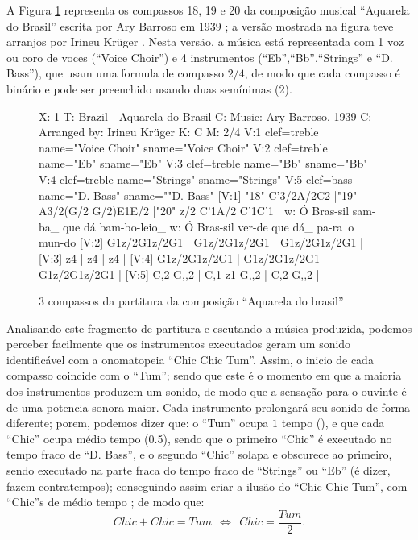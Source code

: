 A Figura \ref{fig:caquarela} representa os compassos 18, 19 e 20 da  
composição musical ``Aquarela do Brasil'' escrita
por Ary Barroso em 1939 \cite{AquarelaDoBrasil}; 
a versão mostrada na figura teve arranjos por Irineu Krüger \cite{Irineu}. 
Nesta versão, a música está representada com 1 voz ou coro de voces (``Voice Choir'') e 4 
instrumentos (``Eb'',``Bb'',``Strings'' e ``D. Bass''), que usam uma 
formula de compasso $2/4$, de modo que cada compasso
é binário e
pode ser preenchido usando duas semínimas (2\quarternote).
\begin{figure}[h]
\centering
\begin{abc}[name=caquarela]
%
X: 1 %
T: Brazil - Aquarela do Brasil
C: Music: Ary Barroso, 1939
C: Arranged by: Irineu Krüger
K: C %
M: 2/4 %
%
V:1 clef=treble name="Voice Choir" sname="Voice Choir"
V:2 clef=treble name="Eb" sname="Eb"
V:3 clef=treble name="Bb" sname="Bb"
V:4 clef=treble name="Strings" sname="Strings"
V:5 clef=bass   name="D. Bass" sname=""D. Bass"
%
%
[V:1] "18" C'3/2A/2C2  |"19" A3/2(G/2 G/2)E1E/2  |"20" z/2 C'1A/2 C'1C'1  |
w:    Ó Bras-sil        sam-ba_ que dá       bam-bo-leio_ 
w:    Ó Bras-sil        ver-de que dá_       pa-ra~o mun-do 
%
%
[V:2] G1z/2G1z/2G1  | G1z/2G1z/2G1  | G1z/2G1z/2G1  |
%
%
[V:3] z4  | z4  | z4  |
%
%
[V:4] G1z/2G1z/2G1  | G1z/2G1z/2G1  | G1z/2G1z/2G1  |
%
%
[V:5] C,2 G,,2  | C,1 z1 G,,2  | C,2 G,,2  |
\end{abc}
\caption{3 compassos da partitura da composição ``Aquarela do brasil''}
\label{fig:caquarela}
\end{figure}


Analisando este fragmento de partitura e escutando a música produzida, 
podemos perceber facilmente que os instrumentos executados geram um sonido identificável
com a onomatopeia ``Chic Chic Tum''.
Assim, o inicio de cada compasso coincide com o ``Tum''; 
sendo que este é o momento em que a maioria dos instrumentos produzem um sonido, 
de modo que a sensação para o ouvinte é de uma potencia sonora maior. 
Cada instrumento prolongará seu sonido de forma diferente; 
porem,  podemos dizer que: o ``Tum'' ocupa $1$ tempo (\quarternote), 
e que cada ``Chic'' ocupa médio tempo (0.5\quarternote),
sendo que o primeiro ``Chic'' é executado no tempo fraco de ``D. Bass'', 
e o segundo ``Chic'' solapa e obscurece ao  primeiro, 
sendo executado na parte fraca do tempo fraco de ``Strings'' ou ``Eb'' (é dizer, fazem contratempos);
conseguindo assim criar a ilusão do ``Chic Chic Tum'', com ``Chic''s de médio tempo ; de modo que:
\begin{equation}
Chic + Chic = Tum ~~ \Longleftrightarrow ~~ Chic = \frac{Tum}{2}.
\end{equation}
 
